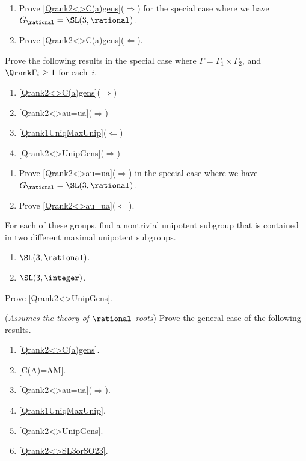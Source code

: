 \begin{exercises}

\item \label{Qrank2<>C(a)gensEx}
	\begin{enumerate}
	\item Prove \cref{Qrank2<>C(a)gens}($\Rightarrow$) for the special case where we have $G_\rational = \SL(3,\rational)$.
	\item Prove \cref{Qrank2<>C(a)gens}($\Leftarrow$).
	\end{enumerate}

\item \label{CentGensGamma1xGamma2Ex}
Prove the following results in the special case where $\Gamma = \Gamma_1 \times \Gamma_2$, and $\Qrank \Gamma_i \ge 1$ for each~$i$.
	\begin{enumerate}
	\item \label{CentGensGamma1xGamma2Ex-C(a)}
	\cref{Qrank2<>C(a)gens}($\Rightarrow$)
	\item \cref{Qrank2<>au=ua}($\Rightarrow$)
	\item \cref{Qrank1UniqMaxUnip}($\Leftarrow$)
	\item \cref{Qrank2<>UnipGens}($\Rightarrow$)
	\end{enumerate}

\item \label{Qrank2<>au=uaEx}
	\begin{enumerate}
	\item Prove \cref{Qrank2<>au=ua}($\Rightarrow$) in the special case where we have $G_\rational = \SL(3,\rational)$.
	\item \label{Qrank2<>au=uaEx-not1}
	Prove \cref{Qrank2<>au=ua}($\Leftarrow$).
	\end{enumerate}

\item \label{Qrank1UniqMaxUnipEx}
For each of these groups, find a nontrivial unipotent subgroup that is contained in two different maximal unipotent subgroups.
	\begin{enumerate}
	\item $\SL(3,\rational)$.
	\item $\SL(3,\integer)$.
	\end{enumerate}

\item \label{Qrank2<>UnipGensEx}
Prove \cref{Qrank2<>UnipGens}.

\item (\emph{Assumes the theory of $\rational$-roots})
Prove the general case of the following results.
	\begin{enumerate}
	\item \cref{Qrank2<>C(a)gens}.
	\item \cref{C(A)=AM}.
	\item \cref{Qrank2<>au=ua}($\Rightarrow$).
	\item \cref{Qrank1UniqMaxUnip}.
	\item \cref{Qrank2<>UnipGens}.
	\item \cref{Qrank2<>SL3orSO23}.
	\end{enumerate}


\end{exercises}
